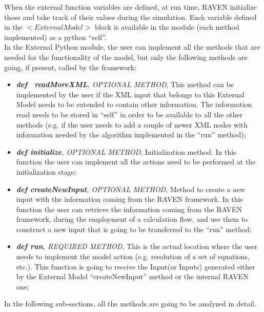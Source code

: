 When the external function variables are defined, at run time, RAVEN initialize those and take track of their values during the simulation. Each variable defined in the $<ExternalModel>$ block is available in the module (each method implemented) as a python ``self''. 
\\ In the External Python module, the user can implement all the methods that are needed for the functionality of the model, but only the following methods are going, if present, called by the framework:
\begin{itemize}
\item \textit{\textbf{def \textunderscore~readMoreXML}, OPTIONAL METHOD}, This method can be implemented by the user if the XML input that belongs to this External Model needs to be extended to contain other information. The information read needs to be stored in ``self'' in order to be available to all the other methods (e.g. if the user needs to add a couple of newer XML nodes with information needed by the algorithm implemented in the ``run'' method);
\item \textit{\textbf{def initialize}, OPTIONAL METHOD}, Initialization method. In this function the user can implement all the actions need to be performed at the initialization stage;
\item \textit{\textbf{def createNewInput}, OPTIONAL METHOD}, Method to create a new input with the information coming from the RAVEN framework. In this function the user can retrieve the information coming from the RAVEN framework, during the employment of a calculation flow, and use them to construct a new input that is going to be transferred to the ``run'' method;
\item \textit{\textbf{def run}, REQUIRED METHOD}, This is the actual location where the user needs to implement the model action (e.g. resolution of a set of equations, etc.). This function is going to receive the Input(or Inputs) generated either by  the External Model ``createNewInput'' method or the internal RAVEN one;
\end{itemize}
In the following sub-sections, all the methods are going to be analyzed in detail.
